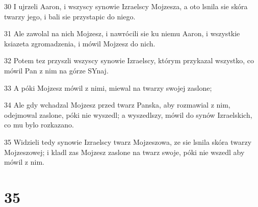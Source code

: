 \par 30 I ujrzeli Aaron, i wszyscy synowie Izraelscy Mojzesza, a oto lsnila sie skóra twarzy jego, i bali sie przystapic do niego.
\par 31 Ale zawolal na nich Mojzesz, i nawrócili sie ku niemu Aaron, i wszystkie ksiazeta zgromadzenia, i mówil Mojzesz do nich.
\par 32 Potem tez przyszli wszyscy synowie Izraelscy, którym przykazal wszystko, co mówil Pan z nim na górze SYnaj.
\par 33 A póki Mojzesz mówil z nimi, miewal na twarzy swojej zaslone;
\par 34 Ale gdy wchadzal Mojzesz przed twarz Panska, aby rozmawial z nim, odejmowal zaslone, póki nie wyszedl; a wyszedlszy, mówil do synów Izraelskich, co mu bylo rozkazano.
\par 35 Widzieli tedy synowie Izraelscy twarz Mojzeszowa, ze sie lsnila skóra twarzy Mojzeszowej; i kladl zas Mojzesz zaslone na twarz swoje, póki nie wszedl aby mówil z nim.

\chapter{35}

